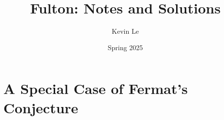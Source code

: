 \documentclass[openany,11pt]{book}
\title{Fulton: Notes and Solutions}
\author{Kevin Le}
\date{Spring 2025}
\begin{document}
\maketitle
\nirtableofcontents
\chapter{A Special Case of Fermat's Conjecture}

\nirprintindex
\end{document}
